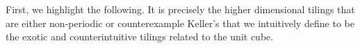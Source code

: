 \documentclass[../thesis.tex]{subfiles}
\begin{document}
First, we highlight the following. It is precisely the higher dimensional tilings that are either non-periodic or counterexample Keller's  that we intuitively define to be the exotic and counterintuitive tilings related to the unit cube.

\end{document}
